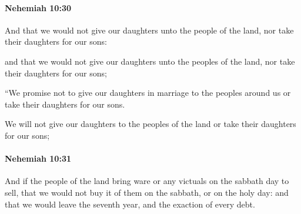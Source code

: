 		\paragraph{Nehemiah 10:30} %
			\label{NEHEMIAH-10-30}

			And that we would not give our daughters unto the people of the land, nor take their daughters for our sons:

			\begin{versebox}
					\item[BHS] 
					\item[LXX] 
					\item[ASV] and that we would not give our daughters unto the peoples of the land, nor take their daughters for our sons;
					\item[NIV] “We promise not to give our daughters in marriage to the peoples around us or take their daughters for our sons.
					\item[NRSV] We will not give our daughters to the peoples of the land or take their daughters for our sons;
			\end{versebox}

		\paragraph{Nehemiah 10:31} %
			\label{NEHEMIAH-10-31}

			And if the people of the land bring ware or any victuals on the sabbath day to sell, that we would not buy it of them on the sabbath, or on the holy day: and that we would leave the seventh year, and the exaction of every debt.

